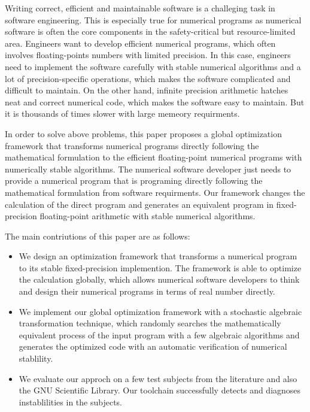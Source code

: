 \documentclass[master,macfonts]{njuthesis}
\begin{document}
\begin{englishabstract}

Writing correct, efficient and maintainable software is a challeging
task in software engineering. This is especially true for numerical 
programs as numerical software is often the core components in the 
safety-critical but resource-limited area. Engineers want to develop 
efficient numerical programs, which often involves floating-points
numbers with limited precision. In this case, engineers need to 
implement the software carefully with stable numerical algorithms 
and a lot of precision-specific operations, which makes the software 
complicated and difficult to maintain. On the other hand, infinite 
precision arithmetic hatches neat and correct numerical code, which 
makes the software easy to maintain. But it is thousands of times 
slower with large memeory requirments.

In order to solve above problems, this paper proposes a global
optimization framework that transforms numerical programs directly
following the mathematical formulation to the efficient floating-point
numerical programs with numerically stable algorithms. The numerical 
software developer just needs to provide a numerical program that is 
programing directly following the mathematical formulation from 
software requirments. Our framework changes the calculation of the 
direct program and generates an equivalent program in fixed-precision
floating-point arithmetic with stable numerical algorithms. 

The main contriutions of this paper are as follows:

\begin{itemize}
  \item 
  We design an optimization framework that transforms a numerical program
  to its stable fixed-precision implemention. The framework is able to 
  optimize the calculation globally, which allows numerical software 
  developers to think and design their numerical programs in terms of real  
  number directly.
  \item 
  We implement our global optimization framework with a stochastic algebraic
  transformation technique, which randomly searches the mathematically
  equivalent process of the input program with a few algebraic algorithms 
  and generates the optimized code with an automatic verification of numerical
  stablility.
  \item 
  We evaluate our approch on a few test subjects from the literature and also
  the GNU Scientific Library. Our toolchain successfully detects and diagnoses
  instablilities in the subjects.
\end{itemize}

\end{englishabstract}
\end{document}
